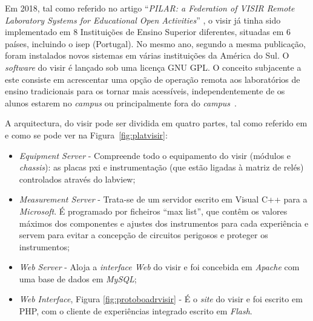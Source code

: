 Em 2018, tal como referido no artigo ``\textit{PILAR: a Federation of VISIR Remote Laboratory Systems for Educational Open Activities}'' \cite{PILARFederationVISIR}, o \acrshort{visir} já tinha sido implementado em 8 Instituições de Ensino Superior diferentes, situadas em 6 países, incluindo o \acrshort{isep} (Portugal). No mesmo ano, segundo a mesma publicação, foram instalados novos sistemas em várias instituições da América do Sul. O \textit{software} do \acrshort{visir} é lançado sob uma licença GNU GPL. O conceito subjacente a este consiste em acrescentar uma opção de operação remota aos laboratórios de ensino tradicionais para os tornar mais acessíveis, independentemente de os alunos estarem no \textit{campus} ou principalmente fora do \textit{campus}~\cite{TheVISIRproject}.

A arquitectura, do \acrshort{visir} pode ser dividida em quatro partes, tal como referido em \cite{tawfikexperiences} e como se pode ver na Figura~\ref{fig:platvisir}:
\begin{itemize}
    \item \textit{Equipment  Server} - Compreende todo o equipamento do \acrshort{visir} (módulos e \textit{chassis}): as placas \acrfull{pxi} e instrumentação (que estão ligadas à matriz de relés) controlados através do \acrshort{labview};
    \item \textit{Measurement Server} - Trata-se de um servidor escrito em Visual C++ para a \textit{Microsoft}. É programado por ficheiros ``max list'', que contêm os valores máximos dos componentes e ajustes dos instrumentos para cada experiência e servem para evitar a concepção de circuitos perigosos e proteger os instrumentos;
    \item \textit{Web Server} - Aloja a \textit{interface Web} do \acrshort{visir} e foi concebida em \textit{Apache} com uma base de dados em \textit{MySQL};
    \item \textit{Web Interface}, Figura \ref{fig:protoboadrvisir} - É o \textit{site} do \acrshort{visir} e foi escrito em PHP, com o cliente de experiências integrado escrito em \textit{Flash}.
\end{itemize}

